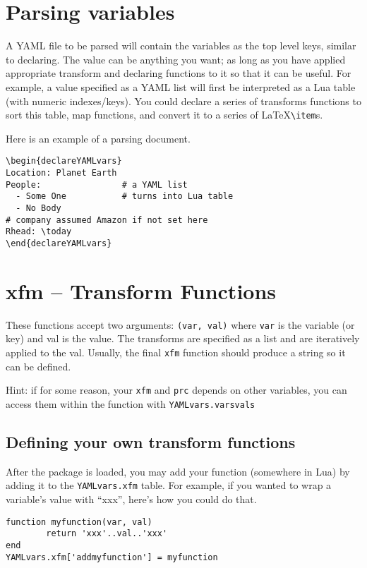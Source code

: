 \documentclass{article}
\begin{document}
\section{Parsing variables}
A YAML file to be parsed will contain the variables as the top level keys, similar to declaring.
The value can be anything you want; as long as you have applied appropriate transform and declaring
functions to it so that it can be useful. For example, a value specified as a YAML list will first be
interpreted as a Lua table (with numeric indexes/keys). You could declare a series of transforms functions
to sort this table, map functions, and convert it to a series of \LaTeX  \texttt{\textbackslash item}s.

Here is an example of a parsing document.


\begin{verbatim}
\begin{declareYAMLvars}
Location: Planet Earth
People:                # a YAML list
  - Some One           # turns into Lua table
  - No Body
# company assumed Amazon if not set here
Rhead: \today
\end{declareYAMLvars}
\end{verbatim}


 \section{xfm -- Transform Functions}
These functions accept two arguments: \texttt{(var, val)} where \texttt{var} is the variable (or key) and val is the value.
The transforms are specified as a list and are iteratively applied to the val.
Usually, the final \texttt{xfm} function should produce a string so it can be defined.

Hint: if for some reason, your \texttt{xfm} and \texttt{prc} depends on other variables,
you can access them within the function
with \texttt{YAMLvars.varsvals}

\subsection{Defining your own transform functions}
After the package is loaded, you may add your function (somewhere in Lua)
by adding it to the \texttt{YAMLvars.xfm} table.
For example, if you wanted to wrap a variable's value with ``xxx'', here's how you could do that.
\begin{verbatim}
function myfunction(var, val)
        return 'xxx'..val..'xxx'
end
YAMLvars.xfm['addmyfunction'] = myfunction
\end{verbatim}
\end{document}
